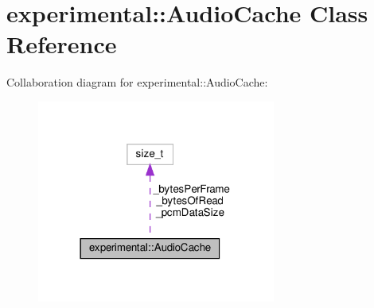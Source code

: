 \hypertarget{classexperimental_1_1AudioCache}{}\section{experimental\+:\+:Audio\+Cache Class Reference}
\label{classexperimental_1_1AudioCache}


Collaboration diagram for experimental\+:\+:Audio\+Cache\+:
\nopagebreak
\begin{figure}[H]
\begin{center}
\leavevmode
\includegraphics[width=222pt]{classexperimental_1_1AudioCache__coll__graph}
\end{center}
\end{figure}
